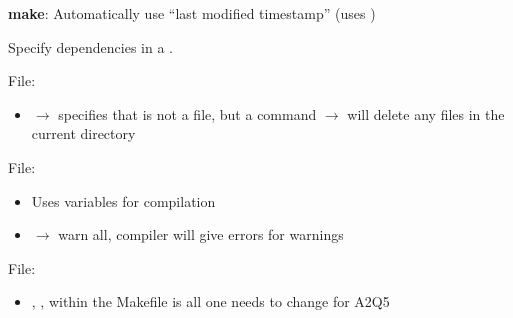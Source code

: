 \textbf{make}: Automatically use ``last modified timestamp'' (uses )

Specify dependencies in a .


File: 
\begin{itemize}
    \item {} $ \rightarrow $ specifies that  is not a file, but
    a command
    \subitem {} $ \rightarrow $  will delete any  files
    in the current directory
\end{itemize}

File: 
\begin{itemize}
    \item Uses variables for compilation
    \item {} $ \rightarrow $ warn all, compiler will give errors for warnings
\end{itemize}

File: 
\begin{itemize}
    \item {}, ,  within
    the Makefile is all one needs to change for A2Q5
\end{itemize}
